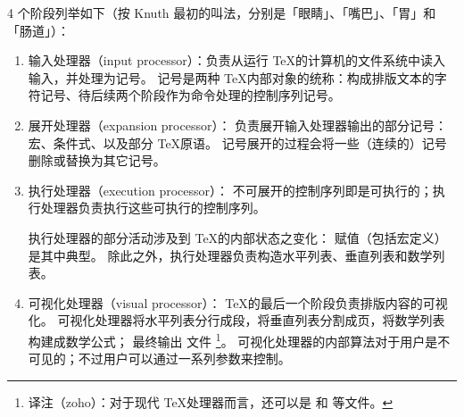 \documentclass{book}
\begin{document}
4 个阶段列举如下（按 Knuth 最初的叫法，分别是「眼睛」、「嘴巴」、「胃」和「肠道」）：
\begin{enumerate}
\item 输入处理器（input processor）：负责从运行 \TeX 的计算机的文件系统中读入输入，并处理为记号。
记号是两种 \TeX 内部对象的统称：构成排版文本的字符记号、待后续两个阶段作为命令处理的控制序列记号。
\item 展开处理器（expansion processor）：
负责展开输入处理器输出的部分记号：宏、条件式、以及部分 \TeX 原语。
记号展开的过程会将一些（连续的）记号删除或替换为其它记号。
\item 执行处理器（execution processor）：
不可展开的控制序列即是可执行的；执行处理器负责执行这些可执行的控制序列。

执行处理器的部分活动涉及到 \TeX 的内部状态之变化：
赋值（包括宏定义）是其中典型。
除此之外，执行处理器负责构造水平列表、垂直列表和数学列表。
\item 可视化处理器（visual processor）：
\TeX 的最后一个阶段负责排版内容的可视化。
可视化处理器将水平列表分行成段，将垂直列表分割成页，将数学列表构建成数学公式；
最终输出  文件%
\footnote{译注（zoho）：对于现代 \TeX 处理器而言，还可以是  和  等文件。}。
可视化处理器的内部算法对于用户是不可见的；不过用户可以通过一系列参数来控制。
\end{enumerate}
\end{document}
